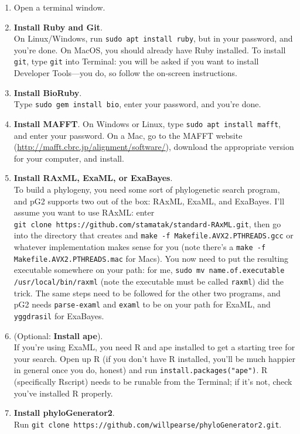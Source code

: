 \documentclass[12pt]{article}
\begin{document}
\begin{enumerate}
\item Open a terminal window.
\item \textbf{Install Ruby and Git}. \\On Linux/Windows, run
  \texttt{sudo apt install ruby}, but in your password, and you're
  done. On MacOS, you should already have Ruby installed. To install
  \texttt{git}, type \texttt{git} into Terminal: you will be asked if you want to install Developer Tools---you do, so follow the on-screen instructions.
\item \textbf{Install BioRuby}. \\Type \texttt{sudo gem install bio},
  enter your password, and you're done.
\item \textbf{Install MAFFT}. On Windows or Linux, type \texttt{sudo
    apt install mafft}, and enter your password. On a Mac, go to the
  MAFFT website (\url{http://mafft.cbrc.jp/alignment/software/}),
  download the appropriate version for your computer, and install.
\item \textbf{Install RAxML, ExaML, or ExaBayes}. \\To build a
  phylogeny, you need some sort of phylogenetic search program, and
  pG2 supports two out of the box: RAxML, ExaML, and ExaBayes. I'll
  assume you want to use RAxML: enter \\\texttt{git clone
    https://github.com/stamatak/standard-RAxML.git}, then go into the
  directory that creates and \texttt{make -f
    Makefile.AVX2.PTHREADS.gcc} or whatever implementation makes sense
  for you (note there's a \texttt{make -f Makefile.AVX2.PTHREADS.mac}
  for Macs). You now need to put the resulting executable somewhere on
  your path: for me, \texttt{sudo mv name.of.executable
    /usr/local/bin/raxml} (note the executable must be called
  \texttt{raxml}) did the trick. The same steps need to be followed
  for the other two programs, and pG2 needs \texttt{parse-examl} and
  \texttt{examl} to be on your path for ExaML, and \texttt{yggdrasil}
  for ExaBayes.
\item (Optional: \textbf{Install ape}). \\If you're using ExaML, you
  need R and ape installed to get a starting tree for your
  search. Open up R (if you don't have R installed, you'll be much
  happier in general once you do, honest) and run
  \texttt{install.packages("ape")}. R (specifically Rscript) needs to
  be runable from the Terminal; if it's not, check you've installed R
  properly.
\item \textbf{Install phyloGenerator2}. \\ Run \texttt{git clone
    https://github.com/willpearse/phyloGenerator2.git}.
\end{enumerate}
\end{document}
